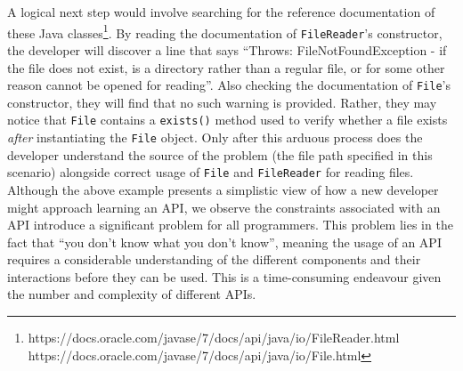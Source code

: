 A logical next step would involve searching for the reference documentation of these Java classes\footnote{https://docs.oracle.com/javase/7/docs/api/java/io/FileReader.html \\\indent https://docs.oracle.com/javase/7/docs/api/java/io/File.html}. By reading the documentation of \lstinline{FileReader}'s constructor, the developer will discover a line that says ``Throws: FileNotFoundException - if the file does not exist, is a directory rather than a regular file, or for some other reason cannot be opened for reading''. Also checking the documentation of \lstinline{File}'s constructor, they will find that no such warning is provided. Rather, they may notice that \lstinline{File} contains a \lstinline{exists()} method used to verify whether a file exists \textit{after} instantiating the \lstinline{File} object. Only after this arduous process does the developer understand the source of the problem (the file path specified in this scenario) alongside correct usage of \lstinline{File} and \lstinline{FileReader} for reading files.\\
Although the above example presents a simplistic view of how a new developer might approach learning an API, we observe the constraints associated with an API introduce a significant problem for all programmers. This problem lies in the fact that ``you don't know what you don't know'', meaning the usage of an API requires a considerable understanding of the different components and their interactions before they can be used. This is a time-consuming endeavour given the number and complexity of different APIs.\bigbreak


